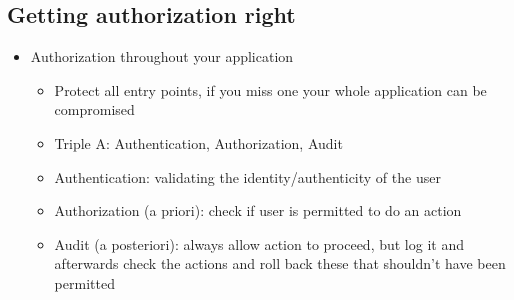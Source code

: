 \documentclass[12pt,titlepage,a4paper]{report}
\begin{document}
			\subsection{Getting authorization right}
			\begin{itemize}
				\item Authorization throughout your application
				\begin{itemize}
					\item Protect all entry points, if you miss one your whole application can be compromised
					\item Triple A: Authentication, Authorization, Audit
					\item Authentication: validating the identity/authenticity of the user
					\item Authorization (a priori): check if user is permitted to do an action
					\item Audit (a posteriori): always allow action to proceed, but log it and afterwards check the actions and roll back these that shouldn't have been permitted
				\end{itemize}
			

\end{itemize}
\end{document}
